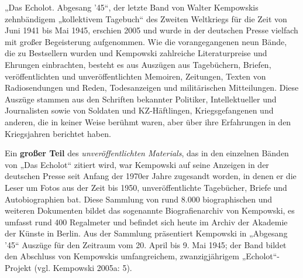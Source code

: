     
\begin{multicols*}{2}

\noindent „Das Echolot. Abgesang ’45“, der letzte Band von Walter Kempowskis zehnbändigem „kollektivem Tagebuch“ des Zweiten Weltkriegs für die Zeit von Juni 1941 bis Mai 1945, erschien 2005 und wurde in der deutschen Presse vielfach mit großer Begeisterung aufgenommen. Wie die vorangegangenen neun Bände, die zu Bestsellern wurden und Kempowski zahlreiche Literaturpreise und Ehrungen einbrachten, besteht es aus Auszügen aus Tagebüchern, Briefen, veröffentlichten und unveröffentlichten Memoiren, Zeitungen, Texten von Radiosendungen und Reden, Todesanzeigen und militärischen Mitteilungen. Diese Auszüge stammen aus den Schriften bekannter Politiker, Intellektueller und Journalisten sowie von Soldaten und KZ-Häftlingen, Kriegsgefangenen und anderen, die in keiner Weise berühmt waren, aber über ihre Erfahrungen in den Kriegsjahren berichtet haben. 

Ein \textbf{großer Teil} des \textit{unveröffentlichten Materials}, das in den einzelnen Bänden von „Das Echolot“ zitiert wird, war Kempowski auf seine Anzeigen in der deutschen Presse seit Anfang der 1970er Jahre zugesandt worden, in denen er die Leser um Fotos aus der Zeit bis 1950, unveröffentlichte Tagebücher, Briefe und Autobiographien bat. Diese Sammlung von rund 8.000 biographischen und weiteren Dokumenten bildet das sogenannte Biografienarchiv von Kempowski, es umfasst rund 400 Regalmeter und befindet sich heute im Archiv der Akademie der Künste in Berlin. Aus der Sammlung präsentiert Kempowski in „Abgesang ’45“ Auszüge für den Zeitraum vom 20. April bis 9. Mai 1945; der Band bildet den Abschluss von Kempowskis umfangreichem, zwanzigjährigem „Echolot“-Projekt (vgl. Kempowski 2005a: 5).


\end{multicols*}
